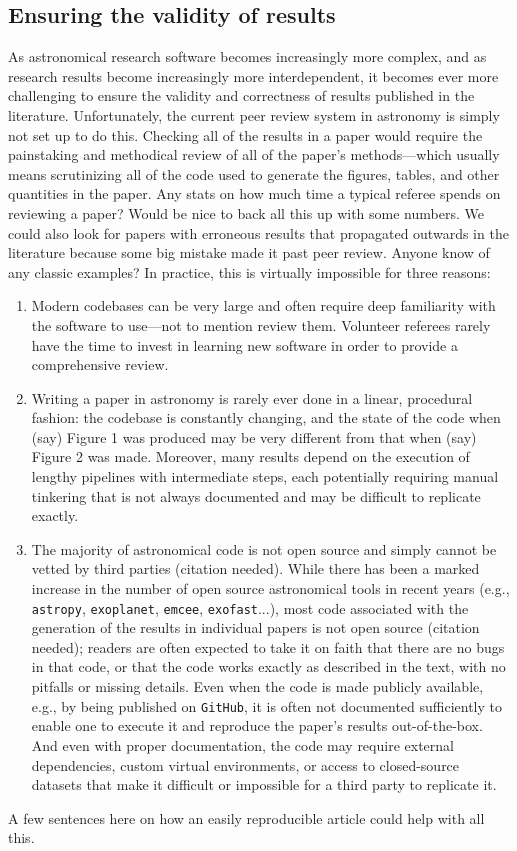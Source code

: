 \documentclass[modern]{aastex631}
\newcommand\xxx[1]{{\color{red}#1}}
\newcommand\needscite{{\color{red}(citation needed)}}
\begin{document}
\subsection{Ensuring the validity of results}
\label{sec:args:validity}
As astronomical research software becomes increasingly more complex, and as research results become increasingly more interdependent, it becomes ever more challenging to ensure the validity and correctness of results published in the literature. 
Unfortunately, the current peer review system in astronomy is simply not set up to do this.
Checking all of the results in a paper would require the painstaking and methodical review of all of the paper's methods---which usually means scrutinizing all of the code used to generate the figures, tables, and other quantities in the paper. 
%
\xxx{Any stats on how much time a typical referee spends on reviewing a paper? Would be nice to back all this up with some numbers.}
%
\xxx{We could also look for papers with erroneous results that propagated outwards in the literature because some big mistake made it past peer review. Anyone know of any classic examples?}
%
In practice, this is virtually impossible for three reasons:
%
\begin{enumerate}
    \item Modern codebases can be very large and often require deep familiarity with the software to use---not to mention review them. Volunteer referees rarely have the time to invest in learning new software in order to provide a comprehensive review.
    \item  Writing a paper in astronomy is rarely ever done in a linear, procedural fashion: the codebase is constantly changing, and the state of the code when (say) Figure 1 was produced may be very different from that when (say) Figure 2 was made. 
    Moreover, many results depend on the execution of lengthy pipelines with intermediate steps, each potentially requiring manual tinkering that is not always documented and may be difficult to replicate exactly.
    \item The majority of astronomical code is not open source and simply cannot be vetted by third parties \needscite. 
    While there has been a marked increase in the number of open source astronomical tools in recent years (e.g., \texttt{astropy}, \texttt{exoplanet}, \texttt{emcee}, \texttt{exofast}...), most code associated with the generation of the results in individual papers is not open source \needscite; readers are often expected to take it on faith that there are no bugs in that code, or that the code works exactly as described in the text, with no pitfalls or missing details. 
    Even when the code is made publicly available, e.g., by being published on \texttt{GitHub}, it is often not documented sufficiently to enable one to execute it and reproduce the paper's results out-of-the-box. 
    And even with proper documentation, the code may require external dependencies, custom virtual environments, or access to closed-source datasets that make it difficult or impossible for a third party to replicate it.
\end{enumerate}
%
\xxx{A few sentences here on how an easily reproducible article could help with all this.}
\end{document}
